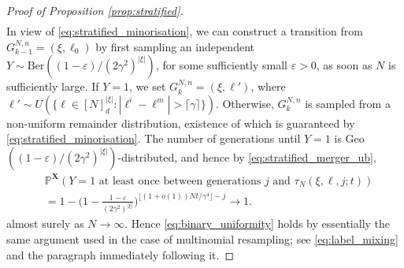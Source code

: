 \documentclass[10pt,a4paper]{amsart}
\newcommand{\bbP}{\mathbb{P}}
\newcommand{\bfX}{\mathbf{X}}
\begin{document}
\begin{proof}[Proof of Proposition \ref{prop:stratified}]
\begin{align}
\end{align}
In view of \eqref{eq:stratified_minorisation}, we can construct a transition from $G_{ k - 1 }^{ N, n } = ( \xi, \ell_0 )$ by first sampling an independent $Y \sim \text{Ber}( ( 1 - \varepsilon ) / ( 2 \gamma^2 )^{ | \xi | } )$, for some sufficiently small $\varepsilon > 0$, as soon as $N$ is sufficiently large.
If $Y = 1$, we set $G_k^{ N, n } = ( \xi, \ell' )$, where $\ell' \sim U( \{ \ell \in [ N ]_d^{ | \xi | } : | \ell^i - \ell^m | > \lceil \gamma \rceil \} )$.
Otherwise, $G_k^{ N, n }$ is sampled from a non-uniform remainder distribution, existence of which is guaranteed by \eqref{eq:stratified_minorisation}.
The number of generations until $Y = 1$ is Geo$( ( 1 - \varepsilon ) / ( 2 \gamma^2 )^{ | \xi | } )$-distributed, and hence by \eqref{eq:stratified_merger_ub},
\begin{align*}
&\bbP^{ \bfX }(Y = 1 \text{ at least once between generations } j \text { and } \tau_N( \xi, \ell, j; t ) ) \\
&= 1 - \Bigg(1 - \frac{ 1 - \varepsilon }{ ( 2 \gamma^2 )^{ | \xi | } } \Bigg)^{ \lfloor (1 + o(1)) N t / \gamma^4 \rfloor - j } \to 1.
\end{align*}
almost surely as $N \to \infty$.
Hence \eqref{eq:binary_uniformity} holds by essentially the same argument used in the case of multinomial resampling; see \eqref{eq:label_mixing} and the paragraph immediately following it.


\end{proof}
\end{document}
